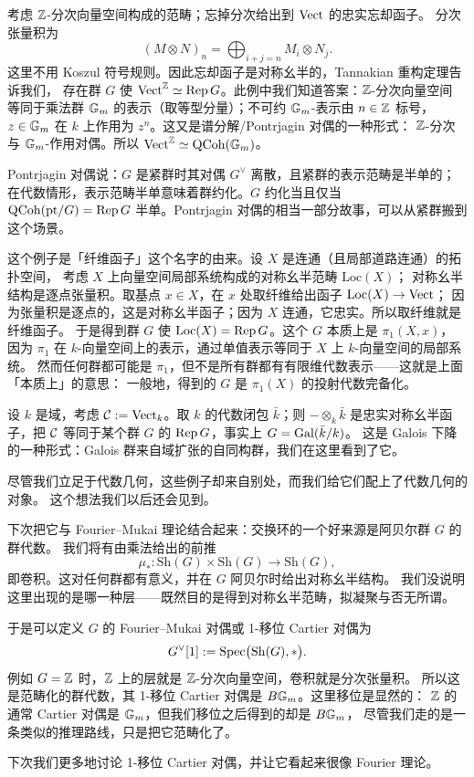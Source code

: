 \begin{example}
考虑 $\mathbb{Z}$-分次向量空间构成的范畴；忘掉分次给出到 $\mathrm{Vect}$ 的忠实忘却函子。
分次张量积为
\[
(M\otimes N)_n=\bigoplus_{i+j=n}M_i\otimes N_j .
\]
这里不用 Koszul 符号规则。因此忘却函子是对称幺半的，Tannakian 重构定理告诉我们，
存在群 $G$ 使 $\mathrm{Vect}^{\mathbb{Z}}\simeq\operatorname{Rep} G$。此例中我们知道答案：$\mathbb{Z}$-分次向量空间
等同于乘法群 $\mathbb{G}_m$ 的表示（取等型分量）；不可约 $\mathbb{G}_m$-表示由 $n\in\mathbb{Z}$ 标号，
$z\in\mathbb{G}_m$ 在 $k$ 上作用为 $z^n$。这又是谱分解/Pontrjagin 对偶的一种形式：
$\mathbb{Z}$-分次与 $\mathbb{G}_m$-作用对偶。所以 $\mathrm{Vect}^{\mathbb{Z}}\simeq\mathrm{QCoh}(\mathbb{G}_m)$。
\end{example}

Pontrjagin 对偶说：$G$ 是紧群时其对偶 $G^\vee$ 离散，且紧群的表示范畴是半单的；
在代数情形，表示范畴半单意味着群约化。$G$ 约化当且仅当 $\mathrm{QCoh}(\mathrm{pt}/G)=\operatorname{Rep} G$
半单。Pontrjagin 对偶的相当一部分故事，可以从紧群搬到这个场景。

\begin{example}
这个例子是「纤维函子」这个名字的由来。设 $X$ 是连通（且局部道路连通）的拓扑空间，
考虑 $X$ 上向量空间局部系统构成的对称幺半范畴 $\mathrm{Loc}(X)$；
对称幺半结构是逐点张量积。取基点 $x\in X$，在 $x$ 处取纤维给出函子 $\mathrm{Loc}(X)\to\mathrm{Vect}$；
因为张量积是逐点的，这是对称幺半函子；因为 $X$ 连通，它忠实。所以取纤维就是纤维函子。
于是得到群 $G$ 使 $\mathrm{Loc}(X)=\operatorname{Rep} G$。这个 $G$ 本质上是 $\pi_1(X,x)$，
因为 $\pi_1$ 在 $k$-向量空间上的表示，通过单值表示等同于 $X$ 上 $k$-向量空间的局部系统。
然而任何群都可能是 $\pi_1$，但不是所有群都有有限维代数表示——这就是上面「本质上」的意思：
一般地，得到的 $G$ 是 $\pi_1(X)$ 的投射代数完备化。
\end{example}

\begin{example}
设 $k$ 是域，考虑 $\mathcal{C}:=\mathrm{Vect}_k$。取 $k$ 的代数闭包 $\bar{k}$；则 $-\otimes_k\bar{k}$
是忠实对称幺半函子，把 $\mathcal{C}$ 等同于某个群 $G$ 的 $\operatorname{Rep} G$，事实上 $G=\operatorname{Gal}(\bar{k}/k)$。
这是 Galois 下降的一种形式：Galois 群来自域扩张的自同构群，我们在这里看到了它。
\end{example}

尽管我们立足于代数几何，这些例子却来自别处，而我们给它们配上了代数几何的对象。
这个想法我们以后还会见到。

下次把它与 Fourier–Mukai 理论结合起来：交换环的一个好来源是阿贝尔群 $G$ 的群代数。
我们将有由乘法给出的前推
\[
\mu_*:\mathrm{Sh}(G)\times\mathrm{Sh}(G)\longrightarrow\mathrm{Sh}(G),
\]
即卷积。这对任何群都有意义，并在 $G$ 阿贝尔时给出对称幺半结构。
我们没说明这里出现的是哪一种层——既然目的是得到对称幺半范畴，拟凝聚与否无所谓。

于是可以定义 $G$ 的 Fourier–Mukai 对偶或 1-移位 Cartier 对偶为
\[
G^\vee[1]:=\operatorname{Spec}\bigl(\mathrm{Sh}(G),*\bigr).
\]
例如 $G=\mathbb{Z}$ 时，$\mathbb{Z}$ 上的层就是 $\mathbb{Z}$-分次向量空间，卷积就是分次张量积。
所以这是范畴化的群代数，其 1-移位 Cartier 对偶是 $B\mathbb{G}_m$。这里移位是显然的：
$\mathbb{Z}$ 的通常 Cartier 对偶是 $\mathbb{G}_m$，但我们移位之后得到的却是 $B\mathbb{G}_m$，
尽管我们走的是一条类似的推理路线，只是把它范畴化了。

下次我们更多地讨论 1-移位 Cartier 对偶，并让它看起来很像 Fourier 理论。
